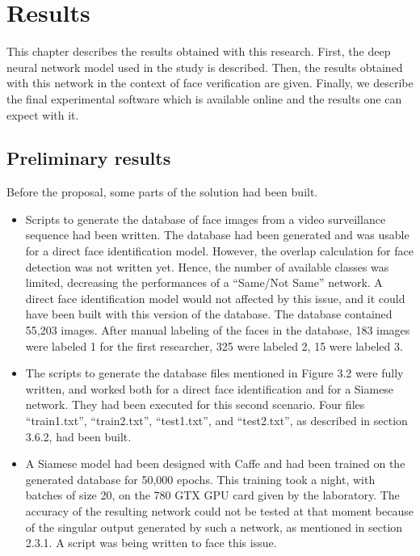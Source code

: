 \setlength{\footskip}{8mm}

\chapter{Results}

\label{ch:results}

This chapter describes the results obtained with this research.
First, the deep neural network model used in the study is described. Then, the results obtained with this network in the context of face verification are given. Finally, we describe the final experimental software which is available online and the results one can expect with it.

\section{Preliminary results}
Before the proposal, some parts of the solution had been built.
\begin{itemize}
\item Scripts to generate the database of face images from a video surveillance sequence had been written. The database had been generated and was usable for a direct face identification model. However, the overlap calculation for face detection was not written yet. Hence, the number of available classes was limited, decreasing the performances of a \enquote{Same/Not Same} network. A direct face identification model would not affected by this issue, and it could have been built with this version of the database. The database contained 55,203 images. After manual labeling of the faces in the database, 183 images were labeled 1 for the first researcher, 325 were labeled 2, 15 were labeled 3.
\item The scripts to generate the database files mentioned in Figure 3.2 were fully written, and worked both for a direct face identification and for a Siamese network. They had been executed for this second scenario. Four files \enquote{train1.txt}, \enquote{train2.txt}, \enquote{test1.txt}, and \enquote{test2.txt}, as described in section 3.6.2, had been built.
\item A Siamese model had been designed with Caffe and had been trained on the generated database for 50,000 epochs. This training took a night, with batches of size 20, on the 780 GTX GPU card given by the laboratory. The accuracy of the resulting network could not be tested at that moment because of the singular output generated by such a network, as mentioned in section 2.3.1. A script was being written to face this issue.
\end{itemize}

